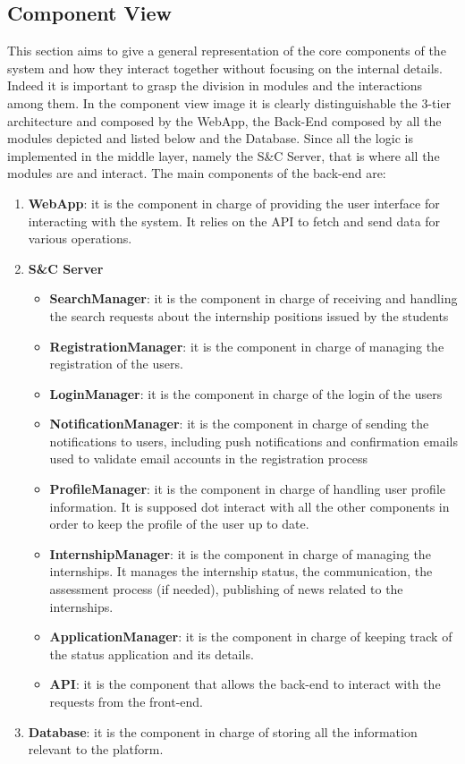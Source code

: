 \subsection{Component View}
This section aims to give a general representation of the core components of the system and how they interact together without focusing on the internal details.
Indeed it is important to grasp the division in modules and the interactions among them. In the component view image it is clearly distinguishable the 3-tier architecture and composed by the WebApp, the Back-End composed by all the modules depicted and listed below and the Database. Since all the logic is implemented in the middle layer, namely the S\&C Server, that is where all the modules are and interact.
The main components of the back-end are:
\begin{enumerate}
    \item \textbf{WebApp}: it is the component in charge of providing the user interface for interacting with the system. It relies on the API to fetch and send data for various operations.
    \item \textbf{S\&C Server}
    \begin{itemize}
        \item \textbf{SearchManager}: it is the component in charge of receiving and handling the search requests about the internship positions issued by the students 
        \item \textbf{RegistrationManager}: it is the component in charge of managing the registration of the users.
        \item \textbf{LoginManager}: it is the component in charge of the login of the users
        \item \textbf{NotificationManager}: it is the component in charge of sending the notifications to users, including push notifications and confirmation emails used to validate email accounts in the registration process
        \item \textbf{ProfileManager}: it is the component in charge of handling user profile information. It is supposed dot interact with all the other components in order to keep the profile of the user up to date.
        \item \textbf{InternshipManager}: it is the component in charge of managing the internships. It manages the internship status, the communication, the assessment process (if needed), publishing of news related to the internships.
        \item \textbf{ApplicationManager}: it is the component in charge of keeping track of the status application and its details.
        \item \textbf{API}: it is the component that allows the back-end to interact with the requests from the front-end.
    \end{itemize}
    \item \textbf{Database}: it is the component in charge of storing all the information relevant to the platform.


\end{enumerate}
